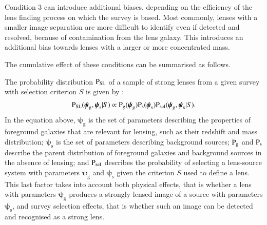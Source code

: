 \documentclass{aa}
\def\psilens{\boldsymbol{\psi}_\mathrm{g}}
\def\psisource{\boldsymbol{\psi}_\mathrm{s}}
\def\prlens{{\rm P}_\mathrm{g}}
\def\prsource{{\rm P}_\mathrm{s}}
\def\prsl{{\rm P}_\mathrm{{SL}}}
\def\psel{{\rm P}_\mathrm{sel}}
\begin{document}
{Condition 3 can introduce additional biases, depending on the efficiency of the lens finding process on which the survey is based. Most commonly, lenses with a smaller image separation are more difficult to identify even if detected and resolved, because of contamination from the lens galaxy. This introduces an additional bias towards lenses with a larger or more concentrated mass.


The cumulative effect of these conditions can be summarised as follows.
}
The probability distribution $\prsl$ of a sample of strong lenses from a given survey with selection criterion $S$ is given by \citep{Son22}:
\begin{equation}\label{eq:one}
\prsl(\psilens,\psisource|S) \propto \prlens(\psilens)\prsource(\psisource)\psel(\psilens,\psisource|S).
\end{equation}
In the equation above, $\psilens$ is the set of parameters describing the properties of foreground galaxies that are relevant for lensing, such as their redshift and mass distribution; $\psisource$ is the set of parameters describing background sources; $\prlens$ and $\prsource$ describe the parent distribution of foreground galaxies and background sources in the absence of lensing; and $\psel$ describes the probability of selecting a lens-source system with parameters $\psilens$ and $\psisource$ given the criterion $S$ used to define a lens.
This last factor takes into account both physical effects, that is whether a lens with parameters $\psilens$ produces a strongly lensed image of a source with parameters $\psisource$, and survey selection effects, that is whether such an image can be detected and recognised as a strong lens.
\end{document}
